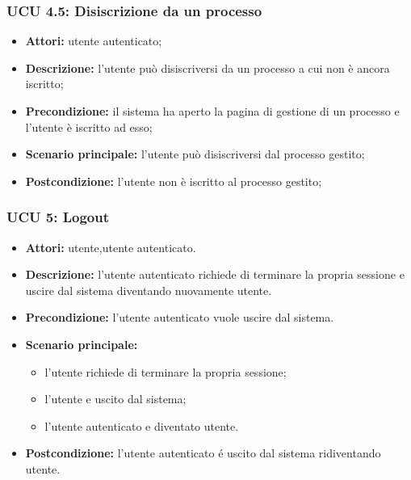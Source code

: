 \subsubsection{UCU 4.5: Disiscrizione da un processo}
\begin{itemize}
\item \textbf{Attori:} utente autenticato;
\item \textbf{Descrizione:} l'utente può disiscriversi da un processo a cui non è ancora iscritto;
\item \textbf{Precondizione:} il sistema ha aperto la pagina di gestione di un processo e l'utente è iscritto ad esso;
\item \textbf{Scenario principale:} l'utente può disiscriversi dal processo gestito;
\item \textbf{Postcondizione:} l'utente non è iscritto al processo gestito;
\end{itemize}

\subsubsection{UCU 5: Logout}
\begin{itemize}
	\item \textbf{Attori:} utente,utente autenticato.
	\item \textbf{Descrizione:} l'utente autenticato richiede di terminare la propria sessione e uscire
	dal sistema diventando nuovamente utente.
	\item \textbf{Precondizione:} l'utente autenticato vuole uscire dal sistema.
	\item \textbf{Scenario principale:}
	\begin{itemize}
		\item l'utente richiede di terminare la propria sessione;
		\item l'utente e uscito dal sistema;
		\item l'utente autenticato e diventato utente.
	\end{itemize}
	\item \textbf{Postcondizione:} l'utente autenticato é uscito dal sistema ridiventando utente.
\end{itemize}